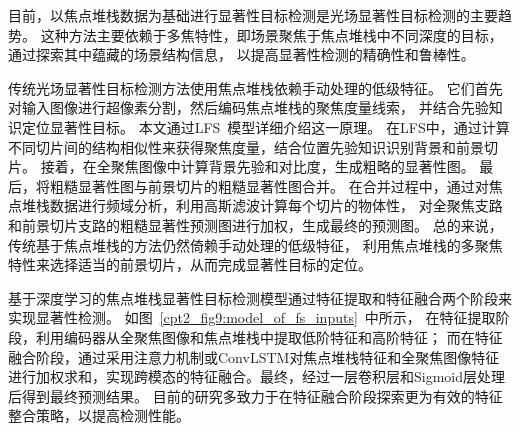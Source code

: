 %
%
%
%
%
%
%
%
%
%
%
目前，以焦点堆栈数据为基础进行显著性目标检测是光场显著性目标检测的主要趋势。
这种方法主要依赖于多焦特性，即场景聚焦于焦点堆栈中不同深度的目标，
通过探索其中蕴藏的场景结构信息，
以提高显著性检测的精确性和鲁棒性。
\par 
%
%
%
%
传统光场显著性目标检测方法使用焦点堆栈依赖手动处理的低级特征。
它们首先对输入图像进行超像素分割，然后编码焦点堆栈的聚焦度量线索，
并结合先验知识定位显著性目标。
本文通过LFS~\cite{li2014saliency}模型详细介绍这一原理。
在LFS中，通过计算不同切片间的结构相似性来获得聚焦度量，结合位置先验知识识别背景和前景切片。
接着，在全聚焦图像中计算背景先验和对比度，生成粗略的显著性图。
最后，将粗糙显著性图与前景切片的粗糙显著性图合并。
在合并过程中，通过对焦点堆栈数据进行频域分析，利用高斯滤波计算每个切片的物体性，
对全聚焦支路和前景切片支路的粗糙显著性预测图进行加权，生成最终的预测图。
总的来说，传统基于焦点堆栈的方法仍然倚赖手动处理的低级特征，
利用焦点堆栈的多聚焦特性来选择适当的前景切片，从而完成显著性目标的定位。\par
%
%
%
%
基于深度学习的焦点堆栈显著性目标检测模型通过特征提取和特征融合两个阶段来实现显著性检测。
如图~\ref{cpt2_fig9:model_of_fs_inputs}~中所示，
在特征提取阶段，利用编码器从全聚焦图像和焦点堆栈中提取低阶特征和高阶特征；
而在特征融合阶段，通过采用注意力机制\cite{zhang2021learning}或ConvLSTM\cite{zhang2019memory}对焦点堆栈特征和全聚焦图像特征进行加权求和，实现跨模态的特征融合。最终，经过一层卷积层和Sigmoid层处理后得到最终预测结果。
目前的研究多致力于在特征融合阶段探索更为有效的特征整合策略，以提高检测性能。
%
%
%
